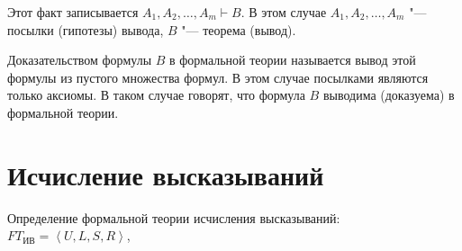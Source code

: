 \begin{itemize}
  Этот факт записывается $A_1,A_2,\ldots,A_m\vdash B$. В этом случае
$A_1,A_2,\ldots,A_m$ "--- посылки (гипотезы) вывода, $B$ "--- теорема
(вывод).

  Доказательством формулы $B$ в формальной теории называется вывод этой
формулы из пустого множества формул. В этом случае посылками являются
только аксиомы. В таком случае говорят, что формула $B$ выводима
(доказуема) в формальной теории.
\end{itemize}

\section{Исчисление высказываний}

Определение формальной теории исчисления высказываний:
$FT_{ИВ}=\left<U,L,S,R\right>$,
